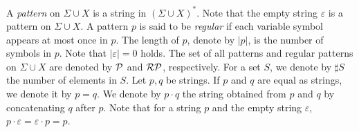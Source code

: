 A \textit{pattern} on $\Sigma \cup X$ is a string in $(\Sigma \cup X)^{\ast}$.
Note that the empty string $\varepsilon$ is a pattern on $\Sigma \cup X$.
A pattern $p$ is said to be \textit{regular} if each variable symbol appears
at most once in $p$.
The length of $p$, denote by $|p|$, is the number of symbols in $p$.
Note that $|\varepsilon|=0$ holds.
The set of all patterns and regular patterns on $\Sigma \cup X$ are denoted by $\mathcal{P}$ and $\mathcal{RP}$, respectively.
For a set $S$, we denote by $\sharp S$ the number of elements in $S$.
Let $p,q$ be strings.
If $p$ and $q$ are equal as strings, we denote it by $p=q$.
We denote by $p\cdot q$ the string obtained from $p$ and $q$ by concatenating $q$ after $p$.
Note that for a string $p$ and the empty string $\varepsilon$, $p\cdot \varepsilon = \varepsilon \cdot p = p$.
%
%

